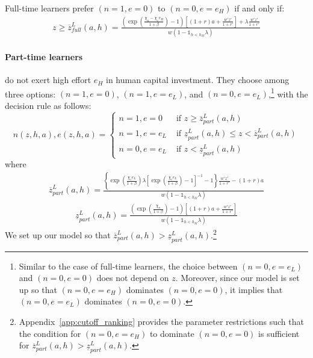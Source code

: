 \documentclass[12pt,english]{article}
\newcommand{\mathbbm}{\mathds}
\numberwithin{equation}{section}
\begin{document}
Full-time learners prefer $(n=1,e=0)$ to $(n=0,e=e_H)$ if and only if:
\begin{align} 
    z \geq \overline{z}^L_{full}(a,h)=\frac{(\exp(\frac{\chi_n-\chi_e e_H}{1+\beta})-1)[(1+r)a+\frac{w'z'}{1+r'}]+\lambda\frac{w'z'}{1+r'}}{w\left(1-\mathbbm{1}_{h < h_M}\lambda\right)} \label{eq:z-slow}
\end{align}

\paragraph{Part-time learners} do not exert high effort $e_H$ in human capital investment. They choose among three options: $(n=1,e=0)$, $(n=1,e=e_L)$, and $(n=0,e=e_L)$,\footnote{Similar to the case of full-time learners, the choice between $(n=0,e=e_L)$ and $(n=0,e=0)$ does not depend on $z$. Moreover, since our model is set up so that $(n=0,e=e_H)$ dominates $(n=0,e=0)$, it implies that $(n=0,e=e_L)$ dominates $(n=0,e=0)$.} with the decision rule as follows:
\begin{equation}
n(z,h,a),e(z,h,a) =\left \{ 
\begin{array}{cl}
n=1,e=0  & \text{ if } z \geq \overline{z}^L_{part}(a,h) \\
n=1,e=e_L & \text{ if } \underline{z}^L_{part}(a,h) \leq z<\overline{z}^L_{part}(a,h) \\
n=0,e=e_L & \text{ if } z<\underline{z}^L_{part}(a,h)
\end{array}%
\right.
\end{equation}
where 
\begin{align}
\overline{z}^L_{part}(a,h)=\frac{\left\{\exp(\frac{\chi_e e_L}{1+\beta})\lambda\left[\exp(\frac{\chi_e e_L}{1+\beta})-1\right]^{-1}-1\right\}\frac{w'z'}{1+r'}-(1+r)a}{w\left(1-\mathbbm{1}_{h < h_M}\lambda\right)}  \label{eq:z-fast-upper}
\end{align}
\begin{align}
\underline{z}^L_{part}(a,h)=\frac{(\exp(\frac{\chi_n}{1+\beta})-1)[(1+r)a+\frac{w'z'}{1+r'}]}{w\left(1-\mathbbm{1}_{h < h_M}\lambda\right)} \label{eq:z-fast-lower}
\end{align}
We set up our model so that $\overline{z}^L_{part}(a,h)>\underline{z}^L_{part}(a,h)$.\footnote{Appendix~\ref{app:cutoff_ranking} provides the parameter restrictions such that the condition for $(n=0,e=e_H)$ to dominate $(n=0,e=0)$ is sufficient for $\overline{z}^L_{part}(a,h)>\underline{z}^L_{part}(a,h)$.} 
\end{document}
